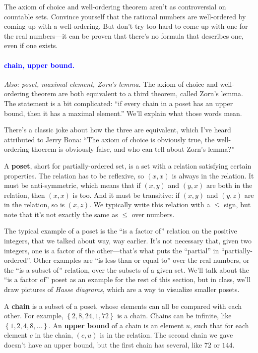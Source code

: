 \documentclass[11pt,paper=letter]{scrartcl}
\renewcommand{\bluebf}[1]{{\bfseries \color{Blue} #1}}
\renewcommand\wp[1]{\paragraph{\textcolor{Blue}{#1.}} \hspace{-1em}}
\newcommand\wl[1]{\label{w:#1}}
\newcommand\oww[1]{\textit{Also: #1.}}
\begin{document}
\begin{exrboxed}
  The axiom of choice and well-ordering theorem aren't as controversial on countable sets. Convince yourself that the rational numbers are well-ordered by coming up with a well-ordering. But don't try too hard to come up with one for the real numbers---it can be proven that there's no formula that describes one, even if one exists.
\end{exrboxed}

\wp{chain, upper bound}
\wl{chain}
\wl{upper bound}
\oww{poset, maximal element, Zorn's lemma}
The axiom of choice and well-ordering theorem are both equivalent to a third theorem, called Zorn's lemma. The statement is a bit complicated: ``if every chain in a poset has an upper bound, then it has a maximal element.'' We'll explain what those words mean.

\begin{remboxed}
  There's a classic joke about how the three are equivalent, which I've heard attributed to Jerry Bona: ``The axiom of choice is obviously true, the well-ordering thoerem is obviously false, and who can tell about Zorn's lemma?''
\end{remboxed}

A \textbf{poset}, short for partially-ordered set, is a set with a relation satisfying certain properties. The relation has to be reflexive, so $(x, x)$ is always in the relation. It must be anti-symmetric, which means that if $(x, y)$ and $(y, x)$ are both in the relation, then $(x, x)$ is too. And it must be transitive: if $(x, y)$ and $(y, z)$ are in the relation, so is $(x, z)$. We typically write this relation with a $\le$ sign, but note that it's not exactly the same as $\le$ over numbers.

The typical example of a poset is the ``is a factor of'' relation on the positive integers, that we talked about way, way earlier. It's not necessary that, given two integers, one is a factor of the other---that's what puts the ``partial'' in ``partially-ordered''. Other examples are ``is less than or equal to'' over the real numbers, or the ``is a subset of'' relation, over the subsets of a given set. We'll talk about the ``is a factor of'' poset as an example for the rest of this section, but in class, we'll draw pictures of \textit{Hasse diagrams}, which are a way to visualize smaller posets.

A \bluebf{chain} is a subset of a poset, whose elements can all be compared with each other. For example, $ \left\{ 2, 8, 24, 1, 72 \right\} $ is a chain. Chains can be infinite, like $ \left\{ 1, 2, 4, 8, \dots \right\} $. An \bluebf{upper bound} of a chain is an element $u$, such that for each element $c$ in the chain, $(c, u)$ is in the relation. The second chain we gave doesn't have an upper bound, but the first chain has several, like $72$ or $144$.
\end{document}
